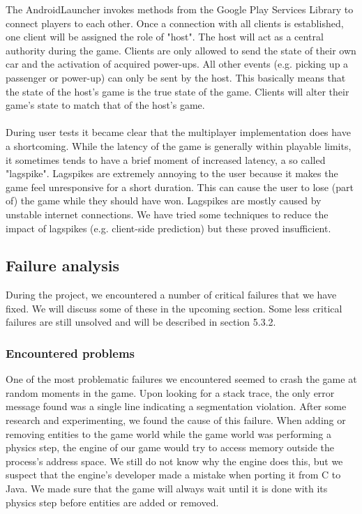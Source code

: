 {The AndroidLauncher invokes methods from the Google Play Services Library to connect players to each other. Once a connection with all clients is established, one client will be assigned the role of "host". The host will act as a central authority during the game. Clients are only allowed to send the state of their own car and the activation of acquired power-ups. All other events (e.g. picking up a passenger or power-up) can only be sent by the host. This basically means that the state of the host's game is the true state of the game. Clients will alter their game's state to match that of the host's game. \\
\\
During user tests it became clear that the multiplayer implementation does have a shortcoming. While the latency of the game is generally within playable limits, it sometimes tends to have a brief moment of increased latency, a so called "lagspike". Lagspikes are extremely annoying to the user because it makes the game feel unresponsive for a short duration. This can cause the user to lose (part of) the game while they should have won. Lagspikes are mostly caused by unstable internet connections. We have tried some techniques to reduce the impact of lagspikes (e.g. client-side prediction) but these proved insufficient.

\subsection{Failure analysis}

During the project, we encountered a number of critical failures that we have fixed. We will discuss some of these in the upcoming section. Some less critical failures are still unsolved and will be described in section 5.3.2. \\

\subsubsection{Encountered problems}


One of the most problematic failures we encountered seemed to crash the game at random moments in the game. Upon looking for a stack trace, the only error message found was a single line indicating a segmentation violation. After some research and experimenting, we found the cause of this failure. When adding or removing entities to the game world while the game world was performing a physics step, the engine of our game would try to access memory outside the process's address space. We still do not know why the engine does this, but we suspect that the engine's developer made a mistake when porting it from C to Java. We made sure that the game will always wait until it is done with its physics step before entities are added or removed. \\

}
